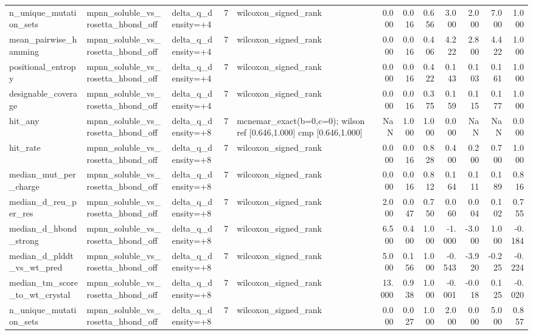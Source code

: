 \begin{table}
{\begin{tabular}{lllrlrrrrrrr}
n\_unique\_mutation\_sets & mpnn\_soluble\_vs\_rosetta\_hbond\_off & delta\_q\_density=+4 & 7 & wilcoxon\_signed\_rank & 0.000 & 0.016 & 0.656 & 3.000 & 2.000 & 7.000 & 1.000 \\
mean\_pairwise\_hamming & mpnn\_soluble\_vs\_rosetta\_hbond\_off & delta\_q\_density=+4 & 7 & wilcoxon\_signed\_rank & 0.000 & 0.016 & 0.406 & 4.222 & 2.800 & 4.422 & 1.000 \\
positional\_entropy & mpnn\_soluble\_vs\_rosetta\_hbond\_off & delta\_q\_density=+4 & 7 & wilcoxon\_signed\_rank & 0.000 & 0.016 & 0.422 & 0.143 & 0.103 & 0.161 & 1.000 \\
designable\_coverage & mpnn\_soluble\_vs\_rosetta\_hbond\_off & delta\_q\_density=+4 & 7 & wilcoxon\_signed\_rank & 0.000 & 0.016 & 0.375 & 0.159 & 0.115 & 0.177 & 1.000 \\
hit\_any & mpnn\_soluble\_vs\_rosetta\_hbond\_off & delta\_q\_density=+8 & 7 & mcnemar\_exact(b=0,c=0); wilson ref [0.646,1.000] cmp [0.646,1.000] & NaN & 1.000 & 1.000 & 0.000 & NaN & NaN & 0.000 \\
hit\_rate & mpnn\_soluble\_vs\_rosetta\_hbond\_off & delta\_q\_density=+8 & 7 & wilcoxon\_signed\_rank & 0.000 & 0.016 & 0.828 & 0.400 & 0.200 & 0.700 & 1.000 \\
median\_mut\_per\_charge & mpnn\_soluble\_vs\_rosetta\_hbond\_off & delta\_q\_density=+8 & 7 & wilcoxon\_signed\_rank & 0.000 & 0.016 & 0.812 & 0.164 & 0.111 & 0.189 & 0.816 \\
median\_d\_reu\_per\_res & mpnn\_soluble\_vs\_rosetta\_hbond\_off & delta\_q\_density=+8 & 7 & wilcoxon\_signed\_rank & 2.000 & 0.047 & 0.750 & 0.060 & 0.004 & 0.102 & 0.755 \\
median\_d\_hbond\_strong & mpnn\_soluble\_vs\_rosetta\_hbond\_off & delta\_q\_density=+8 & 7 & wilcoxon\_signed\_rank & 6.500 & 0.400 & 1.000 & -1.000 & -3.000 & 1.000 & -0.184 \\
median\_d\_plddt\_vs\_wt\_pred & mpnn\_soluble\_vs\_rosetta\_hbond\_off & delta\_q\_density=+8 & 7 & wilcoxon\_signed\_rank & 5.000 & 0.156 & 1.000 & -0.543 & -3.920 & -0.225 & -0.224 \\
median\_tm\_score\_to\_wt\_crystal & mpnn\_soluble\_vs\_rosetta\_hbond\_off & delta\_q\_density=+8 & 7 & wilcoxon\_signed\_rank & 13.000 & 0.938 & 1.000 & -0.001 & -0.018 & 0.125 & -0.020 \\
n\_unique\_mutation\_sets & mpnn\_soluble\_vs\_rosetta\_hbond\_off & delta\_q\_density=+8 & 7 & wilcoxon\_signed\_rank & 0.000 & 0.027 & 1.000 & 2.000 & 0.000 & 5.000 & 0.857 \\

\end{tabular}}
\end{table}
